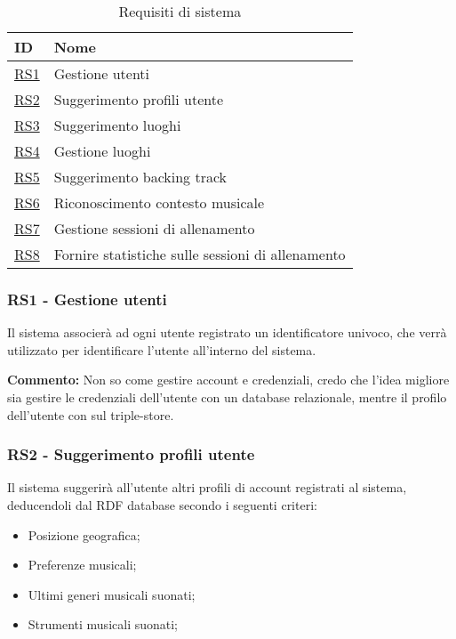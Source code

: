\documentclass[12pt, a4paper]{article}
\begin{document}
\begin{table}
    \centering
    \begin{tabular}{|p{}|p{}|}
        \hline
        \textbf{ID}          & \textbf{Nome}                                     \\
        \hline
        \hyperlink{RS1}{RS1} & Gestione utenti                                   \\
        \hline
        \hyperlink{RS2}{RS2} & Suggerimento profili utente                       \\
        \hline
        \hyperlink{RS3}{RS3} & Suggerimento luoghi                               \\
        \hline
        \hyperlink{RS4}{RS4} & Gestione luoghi                                   \\
        \hline
        \hyperlink{RS5}{RS5} & Suggerimento backing track                        \\
        \hline
        \hyperlink{RS6}{RS6} & Riconoscimento contesto musicale                  \\
        \hline
        \hyperlink{RS7}{RS7} & Gestione sessioni di allenamento                  \\
        \hline
        \hyperlink{RS8}{RS8} & Fornire statistiche sulle sessioni di allenamento \\
        \hline
    \end{tabular}
    \caption{Requisiti di sistema}
\end{table}

\subsubsection*{\hypertarget{RS1}{RS1 - Gestione utenti}}

Il sistema associerà ad ogni utente registrato un identificatore univoco, che verrà utilizzato per identificare l'utente all'interno del sistema.

\textbf{Commento: }Non so come gestire account e credenziali, credo che l'idea migliore sia gestire le credenziali dell'utente con un database relazionale, mentre il profilo dell'utente con sul triple-store.

\subsubsection*{\hypertarget{RS2}{RS2 - Suggerimento profili utente}}

Il sistema suggerirà all'utente altri profili di account registrati al sistema, deducendoli dal RDF database secondo i seguenti criteri:
\begin{itemize}
    \item Posizione geografica;
    \item Preferenze musicali;
    \item Ultimi generi musicali suonati;
    \item Strumenti musicali suonati;
\end{itemize}
\end{document}

